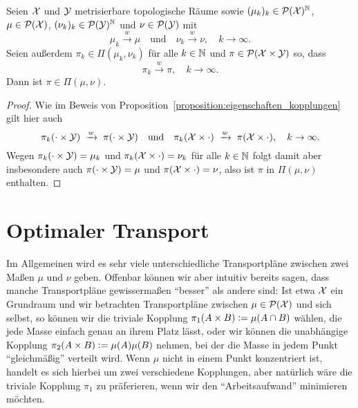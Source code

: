 \documentclass[../thesis/thesis.tex]{subfiles}
\begin{document}
	\begin{Proposition}
		\label{proposition:konvergenz_kopplungen}
		Seien $\mathcal{X}$ und $\mathcal{Y}$ metrisierbare topologische Räume sowie $(\mu_k)_k \in \mathcal{P}(\mathcal{X})^{\mathbb{N}}$, $\mu \in \mathcal{P}(\mathcal{X})$, $(\nu_k)_k \in \mathcal{P}(\mathcal{Y})^{\mathbb{N}}$ und $\nu \in \mathcal{P}(\mathcal{Y})$ mit
		\[ \mu_k \xrightarrow{w} \mu \quad \text{und} \quad \nu_k \xrightarrow{w} \nu, \quad k \to \infty \text{.} \]
		Seien außerdem $\pi_k \in \Pi(\mu_k, \nu_k)$ für alle $k \in \mathbb{N}$ und $\pi \in \mathcal{P}(\mathcal{X} \times \mathcal{Y})$ so, dass
		\[ \pi_k \xrightarrow{w} \pi, \quad k \to \infty \text{.} \]
		Dann ist $\pi \in \Pi(\mu, \nu)$.
	\end{Proposition}

	\begin{proof}
		Wie im Beweis von Proposition~\ref{proposition:eigenschaften_kopplungen} gilt hier auch
		\[ \pi_k(\cdot \times \mathcal{Y}) \; \xrightarrow{w} \; \pi(\cdot \times \mathcal{Y}) \quad \text{und} \quad \pi_k(\mathcal{X} \times \cdot) \; \xrightarrow{w} \; \pi(\mathcal{X} \times \cdot), \quad k \to \infty \text{.} \]
		Wegen $\pi_k(\cdot \times \mathcal{Y}) = \mu_k$ und $\pi_k(\mathcal{X} \times \cdot) = \nu_k$ für alle $k \in \mathbb{N}$ folgt damit aber insbesondere auch $\pi(\cdot \times \mathcal{Y}) = \mu$ und $\pi(\mathcal{X} \times \cdot) = \nu$, also
		ist $\pi$ in $\Pi(\mu, \nu)$ enthalten.
	\end{proof}

	\section{Optimaler Transport}
	\label{subsec:optimaler_transport}
	
	Im Allgemeinen wird es sehr viele unterschiedliche Transportpläne zwischen zwei Maßen $\mu$ und $\nu$ geben. Offenbar können wir aber intuitiv bereits sagen, dass manche Transportpläne gewissermaßen
	\enquote{besser} als andere sind: Ist etwa $\mathcal{X}$ ein Grundraum und wir betrachten Transportpläne zwischen $\mu \in \mathcal{P}(\mathcal{X})$ und sich selbst, so können wir die triviale Kopplung $\pi_1(A \times B) \vcentcolon = \mu(A \cap B)$ wählen, 
	die jede Masse einfach genau an ihrem Platz lässt, oder wir können die unabhängige Kopplung $\pi_2(A \times B) \vcentcolon = \mu(A) \mu(B)$ nehmen, bei der die Masse in jedem Punkt \enquote{gleichmäßig} 
	verteilt wird. Wenn $\mu$ nicht in einem Punkt konzentriert ist, handelt es sich hierbei um zwei verschiedene Kopplungen, aber natürlich wäre die triviale Kopplung $\pi_1$ zu präferieren, wenn wir den
	\enquote{Arbeitsaufwand} minimieren möchten. 
	
\end{document}
